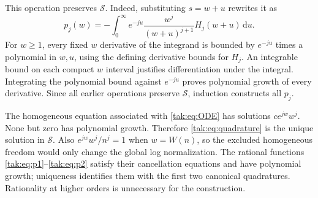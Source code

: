 \documentclass[11pt,letterpaper]{article}
\theoremstyle{remark}\newtheorem{remark}[theorem]{Remark}
\newcommand{\cS}{\mathcal S}\newcommand{\cL}{\mathcal L}
\newcommand{\dd}{\mathrm d}\newcommand{\OO}{\mathcal O}
\begin{document}
This operation preserves $\cS$. Indeed, substituting $s=w+u$ rewrites it as
\begin{equation}
 p_j(w)=-\int_0^\infty e^{-ju}\frac{w^j}{(w+u)^{j+1}}H_j(w+u)\,\dd u.\label{tak:eq:quadrature2}
\end{equation}
For $w\geq1$, every fixed $w$ derivative of the integrand is bounded by $e^{-ju}$ times a polynomial in $w,u$, using the defining derivative bounds for $H_j$. An integrable bound on each compact $w$ interval justifies differentiation under the integral. Integrating the polynomial bound against $e^{-ju}$ proves polynomial growth of every derivative. Since all earlier operations preserve $\cS$, induction constructs all $p_j$.

The homogeneous equation associated with \eqref{tak:eq:ODE} has solutions $ce^{jw}w^j$. None but zero has polynomial growth. Therefore \eqref{tak:eq:quadrature} is the unique solution in $\cS$. Also $e^{jw}w^j/n^j=1$ when $w=W(n)$, so the excluded homogeneous freedom would only change the global log normalization. The rational functions \eqref{tak:eq:p1}--\eqref{tak:eq:p2} satisfy their cancellation equations and have polynomial growth; uniqueness identifies them with the first two canonical quadratures. Rationality at higher orders is unnecessary for the construction.
\end{document}
